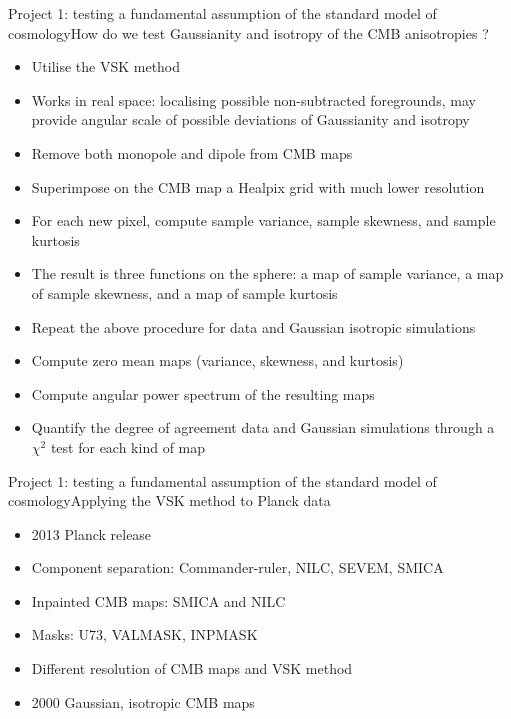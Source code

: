 \documentclass{beamer}
\begin{document}
\begin{frame}{Project 1: testing a fundamental assumption of the standard model of cosmology}{How do we test Gaussianity and isotropy of the CMB anisotropies ?}
\begin{itemize}
\item Utilise the VSK method
\item Works in real space: localising possible non-subtracted foregrounds, may provide angular scale of possible deviations of Gaussianity and isotropy
\item Remove both monopole and dipole from CMB maps
\item Superimpose on the CMB map a Healpix grid with much lower resolution
\item For each new pixel, compute sample variance, sample skewness, and sample kurtosis 
\item The result is three functions on the sphere: a map of sample variance, a map of sample skewness, and a map of sample kurtosis
\item Repeat the above procedure for data and Gaussian isotropic simulations
\item Compute zero mean maps (variance, skewness, and kurtosis)
\item Compute angular power spectrum of the resulting maps
\item Quantify the degree of agreement data and Gaussian simulations through a $\chi^2$ test for each kind of map 
\end{itemize}
\end{frame}

\begin{frame}{Project 1: testing a fundamental assumption of the standard model of cosmology}{Applying the VSK method to Planck data}
\begin{itemize}
\item 2013 Planck release 
\item Component separation: Commander-ruler, NILC, SEVEM, SMICA
\item Inpainted CMB maps: SMICA and NILC
\item Masks: U73, VALMASK, INPMASK
\item Different resolution of CMB maps and VSK method
\item 2000 Gaussian, isotropic CMB maps
\end{itemize}
\end{frame}
\end{document}
